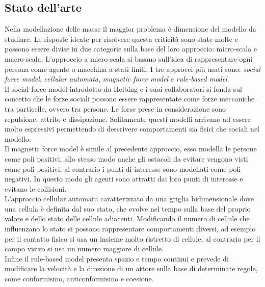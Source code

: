 \subsection{Stato dell'arte}
Nella modellazione delle masse il maggior problema è dimensione del modello da studiare. Le risposte ideate per risolvere questa criticità sono state molte e possono essere divise in due categorie sulla base del loro approccio: micro-scala e macro-scala.  
L'approccio a micro-scala si basano sull'idea di rappresentare ogni persona come agente o macchina a stati finiti. I tre approcci più usati sono: \textit{social force model}, \textit{cellular automata}, \textit{magnetic force model} e \textit{rule-based model}.\\
Il social force model introdotto da Helbing e i suoi collaboratori \cite{helbing} si fonda sul concetto che le forze sociali possono essere rappresentate come forze meccaniche tra particelle, ovvero tra persone. Le forse prese in considerazione sono repulsione, attrito e dissipazione. Solitamente questi modelli arrivano ad essere molto espressivi permettendo di descrivere comportamenti sia fisici che sociali nel modello.\\
Il magnetic force model \cite{okazaki} è simile al precedente approccio, esso modella le persone come poli positivi, allo stesso modo anche gli ostacoli da evitare vengono visti come poli positivi, al contrario i punti di interesse sono modellati come poli negativi. In questo modo gli agenti sono attratti dai loro punti di interesse e evitano le collisioni.\\
L'approccio cellular automata \cite{dijkstra} caratterizzato da una griglia bidimensionale dove una cellula è definita dal suo stato, che evolve nel tempo sulla base del proprio valore e dello stato delle cellule adiacenti. Modificando il numero di cellule che influenzano lo stato si possono rappresentare comportamenti diversi, ad esempio per il contatto fisico si usa un insieme molto ristretto di cellule, al contrario per il campo visivo si usa un numero maggiore di cellule.\\
Infine il rule-based model \cite{reynolds} presenta spazio e tempo continui e prevede di modificare la velocità e la direzione di un attore sulla base di determinate regole, come conformismo, anticonformismo e coesione.\\
